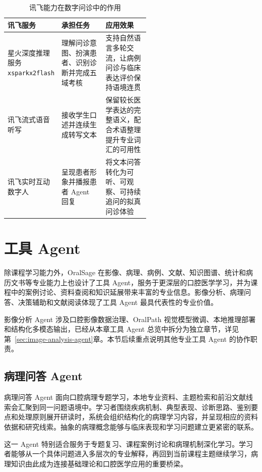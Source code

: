 \begin{table}[H]
  \centering
  \caption{讯飞能力在数字问诊中的作用}
  \label{tab:clinical-xfyun-capabilities}
  \begin{tabularx}{\linewidth}{p{0.25\linewidth}p{0.31\linewidth}X}
    \toprule
    讯飞服务 & 承担任务 & 应用效果 \\
    \midrule
    星火深度推理服务 \texttt{xsparkx2flash} & 理解问诊意图、扮演患者、识别诊断并完成五域考核 & 支持自然语言多轮交流，让病例问诊与临床表达评价保持语境连贯 \\
    讯飞流式语音听写 & 接收学生口述并连续生成转写文本 & 保留较长医学表达的完整语义，配合术语整理提升专业词汇的可用性 \\
    讯飞实时互动数字人 & 呈现患者形象并播报患者 Agent 回复 & 将文本问答转化为可听、可观察、可持续追问的拟真问诊体验 \\
    \bottomrule
  \end{tabularx}
\end{table}

\section{工具 Agent}

除课程学习能力外，OralSage 在影像、病理、病例、文献、知识图谱、统计和病历文书等专业能力上也设计了工具 Agent，服务于更深层的口腔医学学习，并为课程中的案例讨论、资料查阅和知识延展带来丰富的专业信息。影像分析、病理问答、决策辅助和文献阅读体现了工具 Agent 最具代表性的专业价值。

影像分析 Agent 涉及口腔影像数据治理、OralPath 视觉模型微调、本地推理部署和结构化多模态输出，已经从本章工具 Agent 总览中拆分为独立章节，详见第~\ref{sec:image-analysis-agent}章。本节后续重点说明其他专业工具 Agent 的协作职责。

\subsection{病理问答 Agent}

病理问答 Agent 面向口腔病理专题学习，本地专业资料、主题检索和前沿文献线索会汇聚到同一问题语境中。学习者围绕疾病机制、典型表现、诊断思路、鉴别要点和处理原则展开研读时，系统会组织结构化的病理学习内容，并呈现相应的资料依据和研究线索。抽象的病理概念能够与临床表现和学习问题建立更紧密的联系。

这一 Agent 特别适合服务于专题复习、课程案例讨论和病理机制深化学习。学习者能够从一个具体问题进入多层次的专业解释，再回到当前课程主题继续学习，病理知识由此成为连接基础理论和口腔医学应用的重要桥梁。

